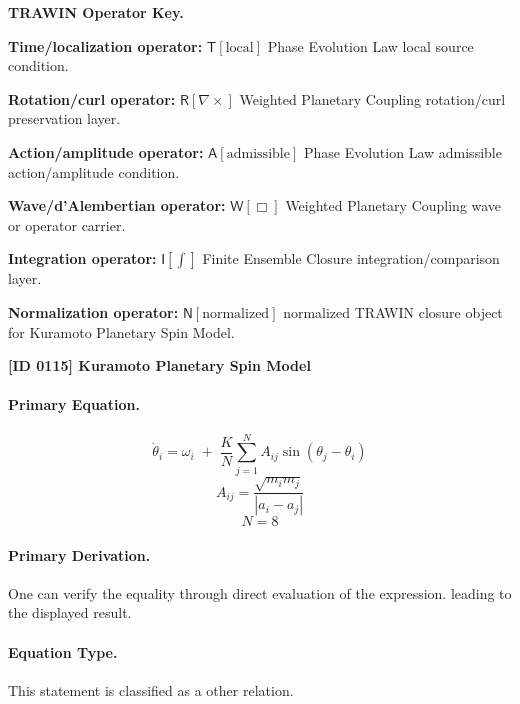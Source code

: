 \par\vspace{0.45\baselineskip}
\noindent\begin{minipage}[t]{\linewidth}
\begingroup
\small
\raggedright
\textbf{TRAWIN Operator Key.}\par
\noindent\textbf{Time/localization operator:} $\mathsf{T}\!\left[\mathrm{local}\right]$ Phase Evolution Law local source condition.\par
\noindent\textbf{Rotation/curl operator:} $\mathsf{R}\!\left[\nabla\times\right]$ Weighted Planetary Coupling rotation/curl preservation layer.\par
\noindent\textbf{Action/amplitude operator:} $\mathsf{A}\!\left[\mathrm{admissible}\right]$ Phase Evolution Law admissible action/amplitude condition.\par
\noindent\textbf{Wave/d'Alembertian operator:} $\mathsf{W}\!\left[\Box\right]$ Weighted Planetary Coupling wave or operator carrier.\par
\noindent\textbf{Integration operator:} $\mathsf{I}\!\left[\int\right]$ Finite Ensemble Closure integration/comparison layer.\par
\noindent\textbf{Normalization operator:} $\mathsf{N}\!\left[\mathrm{normalized}\right]$ normalized TRAWIN closure object for Kuramoto Planetary Spin Model.\par
\endgroup
\end{minipage}

\clearpage
\noindent\textbf{[ID 0115] Kuramoto Planetary Spin Model}\par
\vspace{0.35em}
\paragraph{Primary Equation.}
\[
\dot{\theta}_i
=
\omega_i
\;+\;
\frac{K}{N}\sum_{j=1}^{N}A_{ij}\sin(\theta_j-\theta_i)
\]
\[
A_{ij}=\frac{\sqrt{m_i m_j}}{|a_i-a_j|}
\]
\[
N=8
\]

\paragraph{Primary Derivation.}
One can verify the equality through direct evaluation of the expression. leading to the displayed result.
\paragraph{Equation Type.}
This statement is classified as a other relation.

